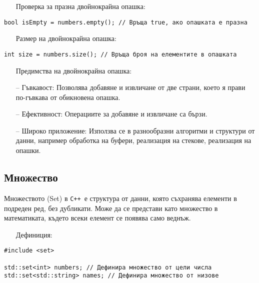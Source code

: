 \documentclass[oneside]{book}
\newcommand*{\cpp}{\texttt{C++}\ }
\begin{document}
\begin{itemize}\item[Проверка] за празна двойнокрайна опашка:\end{itemize}
\begin{mdframed}\begin{lstlisting}
bool isEmpty = numbers.empty(); // Връща true, ако опашката е празна
\end{lstlisting}\end{mdframed}

\begin{itemize}\item[Размер] на двойнокрайна опашка:\end{itemize}
\begin{mdframed}\begin{lstlisting}
int size = numbers.size(); // Връща броя на елементите в опашката
\end{lstlisting}\end{mdframed}

\begin{itemize}\item[Предимства] на двойнокрайна опашка:\end{itemize}
\begin{itemize}
    \item[--] Гъвкавост: Позволява добавяне и извличане от две страни, което я прави по-гъвкава от обикновена опашка.
    \item[--] Ефективност: Операциите за добавяне и извличане са бързи.
    \item[--] Широко приложение: Използва се в разнообразни алгоритми и структури от данни, например обработка на буфери, реализация на стекове, реализация на опашки.
\end{itemize}

\subsection{Множество}
Множеството (Set) в \cpp е структура от данни, която съхранява елементи в подреден ред, без дубликати. Може да се представи като множество в математиката, където всеки елемент се появява само веднъж.

\begin{itemize}\item[Дефиниция:]\end{itemize}
\begin{mdframed}\begin{lstlisting}
#include <set>

std::set<int> numbers; // Дефинира множество от цели числа
std::set<std::string> names; // Дефинира множество от низове
\end{lstlisting}\end{mdframed}
\end{document}
